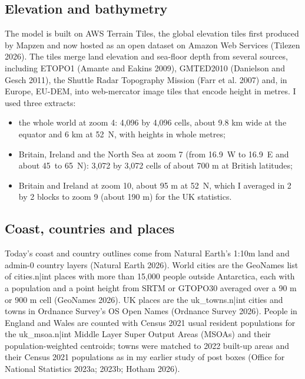 \documentclass[11pt,a4paper]{article}
\begin{document}
\subsection{Elevation and bathymetry}

The model is built on AWS Terrain Tiles, the global elevation tiles first produced by Mapzen and now hosted as an open dataset on Amazon Web Services (Tilezen 2026). The tiles merge land elevation and sea-floor depth from several sources, including ETOPO1 (Amante and Eakins 2009), GMTED2010 (Danielson and Gesch 2011), the Shuttle Radar Topography Mission (Farr et al. 2007) and, in Europe, EU-DEM, into web-mercator image tiles that encode height in metres. I used three extracts:
\begin{itemize}
\item the whole world at zoom 4: 4,096 by 4,096 cells, about 9.8 km wide at the equator and 6 km at 52\textdegree\ N, with heights in whole metres;
\item Britain, Ireland and the North Sea at zoom 7 (from 16.9\textdegree\ W to 16.9\textdegree\ E and about 45\textdegree\ to 65\textdegree\ N): 3,072 by 3,072 cells of about 700 m at British latitudes;
\item Britain and Ireland at zoom 10, about 95 m at 52\textdegree\ N, which I averaged in 2 by 2 blocks to zoom 9 (about 190 m) for the UK statistics.
\end{itemize}

\subsection{Coast, countries and places}

Today's coast and country outlines come from Natural Earth's 1:10m land and admin-0 country layers (Natural Earth 2026). World cities are the GeoNames list of {{cities.n|int}} places with more than 15,000 people outside Antarctica, each with a population and a point height from SRTM or GTOPO30 averaged over a 90 m or 900 m cell (GeoNames 2026). UK places are the {{uk_towns.n|int}} cities and towns in Ordnance Survey's OS Open Names (Ordnance Survey 2026). People in England and Wales are counted with Census 2021 usual resident populations for the {{uk_msoa.n|int}} Middle Layer Super Output Areas (MSOAs) and their population-weighted centroids; towns were matched to 2022 built-up areas and their Census 2021 populations as in my earlier study of post boxes (Office for National Statistics 2023a; 2023b; Hotham 2026).
\end{document}
